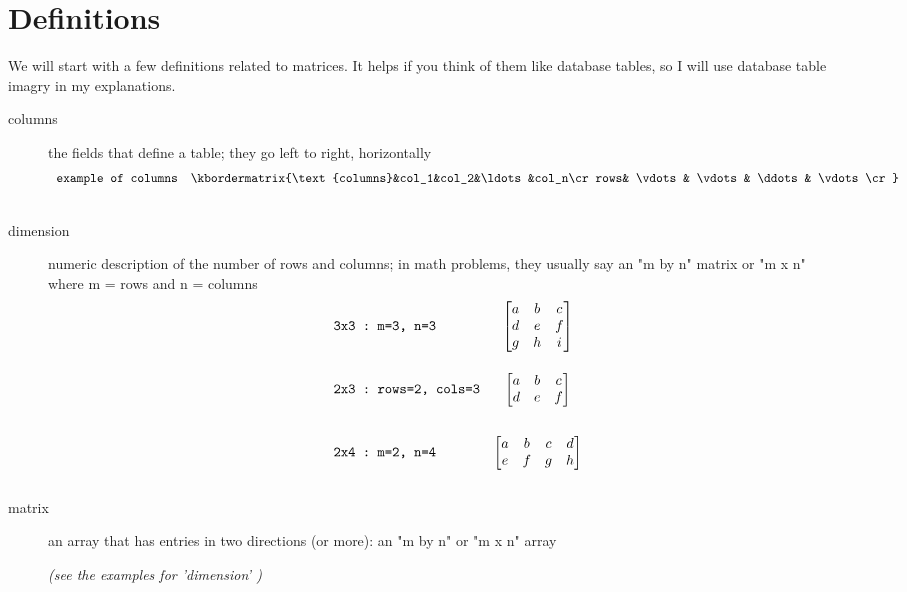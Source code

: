 
\section{Definitions}
We will start with a few definitions related to matrices.  It helps if you think of them like database tables, so I will use database table imagry in my explanations.
\\
\begin{description}
\item [columns] the fields that define a table; they go left to right, horizontally
\[
\begin{array}{lc}
 \verb|example of columns| & \kbordermatrix{\text{columns}&col_1&col_2&\ldots &col_n\cr
                rows& \vdots & \vdots & \ddots & \vdots\cr
               } \\[15pt]
\end{array}
\]


\item [dimension] numeric description of the number of rows and columns; in math problems, they usually say an "m by n" matrix or "m x n" \\where m = rows and n = columns
\[
\begin{array}{lc}
  \verb|3x3 : m=3, n=3| & \begin{bmatrix}
                    a & b & c \\
                    d & e & f \\
                    g & h & i
                  \end{bmatrix} \\[15pt]
\\
  \verb|2x3 : rows=2, cols=3| & \begin{bmatrix}
                    a & b & c \\
                    d & e & f 
                  \end{bmatrix} \\[15pt]
\\
  \verb|2x4 : m=2, n=4| & \begin{bmatrix}
                    a & b & c & d\\
                    e & f & g & h 
                  \end{bmatrix} \\[15pt]
\end{array}
\]
\item [matrix] an array that has entries in two directions (or more): an "m by n" or "m x n" array


\centerline{\it (see the examples for 'dimension' ) }


\end{description}
